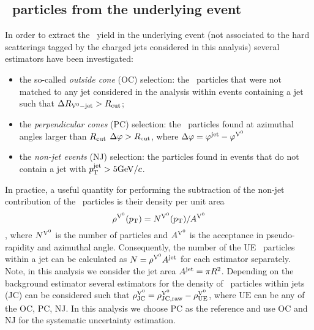 

\subsection{\Vzero\ particles from the underlying event}
\label{sec:V0UE}

In order to extract the \Vzero\ yield in the underlying event (not associated to the hard scatterings tagged by the charged jets considered in this analysis) several estimators have been investigated:
\begin{itemize}
  \item the so-called {\it outside cone} (OC) selection: the \Vzero\ particles that were not matched to any jet considered in the analysis within events containing a jet such that $\Delta R_{{\rm V}^{0}-{\rm jet}} > R_{\rm cut}$;
  \item the {\it perpendicular cones} (PC) selection: the \Vzero\ particles found at azimuthal angles larger than $R_{\rm cut}$ $\Delta \varphi > R_{\rm cut}$, where $\Delta \varphi= \varphi^{\rm jet} - \varphi^{{\rm V}^{0}}$  
  \item the {\it non-jet events } (NJ) selection: the \Vzero particles found in events that do not contain a jet with $p_{\mathrm{T}}^{\mathrm{jet}}>5 \mathrm{GeV}/c$.
\end{itemize}

In practice, a useful quantity for performing the subtraction of the non-jet contribution of the \Vzero\ particles is their density per unit area 
\begin{equation}
\rho^{{\rm V}^{0}}(p_{\mathrm{T}}) = N^{{\rm V}^{0}}(p_{\mathrm{T}}) / A^{{\rm V}^{0}}
\label{eq:defv0rho}
\end{equation}
, where $N^{{\rm V}^{0}}$ is the number of particles and $A^{{\rm V}^{0}}$ is the acceptance in pseudo-rapidity and azimuthal angle. Consequently, the number of the UE \Vzero\ particles within a jet can be calculated as $N=\rho^{{\rm V}^{0}} A^{\mathrm{jet}}$ for each estimator separately. Note, in this analysis we consider the jet area $A^{\mathrm{jet}} = \pi R^2$. Depending on the background estimator several estimators for the density of \Vzero\ particles within jets (JC) can be considered such that $ \rho^{{\rm V}^{0}} _{\mathrm{JC}} =  \rho^{{\rm V}^{0}} _{\mathrm{JC, raw}} -  \rho^{{\rm V}^{0}} _{\mathrm{UE}}$, where $\mathrm{UE}$ can be any of the OC, PC, NJ. In this analysis we choose PC as the reference and use OC and NJ for the systematic uncertainty estimation.

